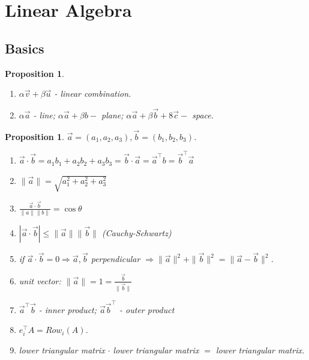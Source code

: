 \documentclass[14pt]{article}
\newtheorem{proposition}[theorem]{Proposition}
\theoremstyle{definition}
\theoremstyle{remark}
\begin{document}
\section{Linear Algebra}
\begin{multicols}{2}

    \section{Basics}
    \begin{proposition}
        \begin{enumerate}
            \item $\alpha \vec{v}+\beta \vec{u}$ - linear combination.
            \item $\alpha \vec{a}$ - line; \quad  $\alpha \vec{a}+\beta b-$ plane; \quad $\alpha \vec{a}+\beta \vec{b}+8 \vec{c}-$ space.
        \end{enumerate}
    \end{proposition}


    \begin{proposition}$\vec{a}=\left(a_1, a_2, a_3\right), \vec{b}=\left(b_1, b_2, b_3\right)$.
        \begin{enumerate}
            \item $\vec{a} \cdot \vec{b}=a_1 b_1+a_2 b_2+a_3 b_3=\vec{b} \cdot \vec{a}=\vec{a}^{\top} b=\vec{b}^{\top} \vec{a}$
            \item $\|\vec{a}\|=\sqrt{a_1^2+a_2^2+a_3^2}$
            \item $\frac{\vec{a} \cdot \vec{b}}{\|a\|\|b\|}=\cos \theta$
            \item $|\vec{a} \cdot \vec{b}| \leq\|\vec{a}\|\|\vec{b}\|$ (Cauchy-Schwartz)
            \item if $\vec{a} \cdot \vec{b}=0 \Rightarrow \vec{a}, \vec{b}$ perpendicular $\Rightarrow\|\vec{a}\|^2+\|\vec{b}\|^2=\|\vec{a}-\vec{b}\|^2$.
            \item  unit vector: $\|\vec{a}\|=1=\frac{\vec{b}}{\|\vec{b}\|}$
            \item $\vec{a}^\top \vec{b}$ - inner product; $\vec{a} \vec{b}^\top$ - outer product
            \item $e_i^\top A = Row_i(A)$.
            \item lower triangular matrix $\cdot$ lower triangular matrix $=$ lower triangular matrix.
        \end{enumerate}
    \end{proposition}


\end{multicols}
\end{document}
